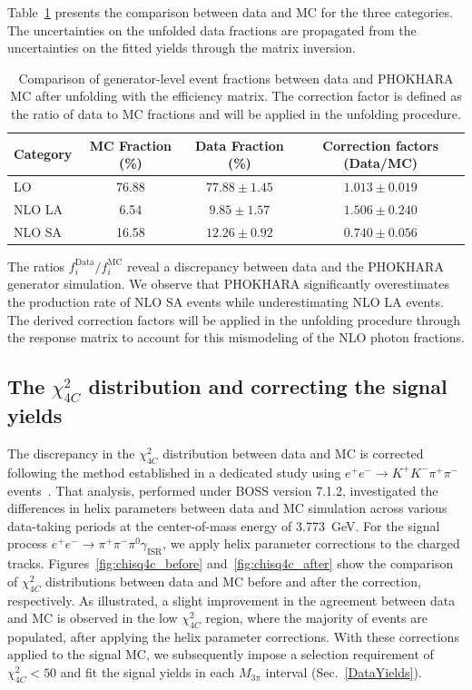 Table~\ref{tab:nlo_fraction_unfolded} presents the comparison between data and MC for the three categories. The uncertainties on the unfolded data fractions are propagated from the uncertainties on the fitted yields through the matrix inversion.

\begin{table}[htbp]
    \centering
    \caption{Comparison of generator-level event fractions between data and PHOKHARA MC after unfolding with the efficiency matrix. The correction factor is defined as the ratio of data to MC fractions and will be applied in the unfolding procedure.}
    \vspace{4mm}
    \begin{tabular}{lccc}
        \hline
        Category & MC Fraction (\%) & Data Fraction (\%) & Correction factors (Data/MC) \\
        \hline
        LO       & 76.88 & $77.88 \pm 1.45$ & $1.013 \pm 0.019$ \\
        NLO LA   & 6.54  & $9.85 \pm 1.57$  & $1.506 \pm 0.240$ \\
        NLO SA   & 16.58 & $12.26 \pm 0.92$ & $0.740 \pm 0.056$ \\
        \hline
    \end{tabular}
    \label{tab:nlo_fraction_unfolded}
\end{table}

The ratios $f_i^{\text{Data}} / f_i^{\text{MC}}$ reveal a discrepancy between data and the PHOKHARA generator simulation. We observe that PHOKHARA significantly overestimates the production rate of NLO SA events while underestimating NLO LA events. The derived correction factors will be applied in the unfolding procedure through the response matrix to account for this mismodeling of the NLO photon fractions.

\subsection{The $\chi^2_{4C}$ distribution and correcting the signal yields}
\label{sec:corr_kmfit}
The discrepancy in the $\chi^2_{4C}$ distribution between data and MC is corrected following the method established in a dedicated study using $e^+e^- \to K^+K^-\pi^+\pi^-$ events~\cite{BESIII_chisq4C_correction_2025}. That analysis, performed under BOSS version 7.1.2, investigated the differences in helix parameters between data and MC simulation across various data-taking periods at the center-of-mass energy of 3.773~GeV. For the signal process $e^+e^- \to \pi^+\pi^-\pi^0\gamma_{\text{ISR}}$, we apply helix parameter corrections to the charged tracks. Figures~\ref{fig:chisq4c_before} and~\ref{fig:chisq4c_after} show the comparison of $\chi^2_{4C}$ distributions between data and MC before and after the correction, respectively. As illustrated, a slight improvement in the agreement between data and MC is observed in the low $\chi^2_{4C}$ region, where the majority of events are populated, after applying the helix parameter corrections. With these corrections applied to the signal MC, we subsequently impose a selection requirement of $\chi^2_{4C} < 50$ and fit the signal yields in each $M_{3\pi}$ interval (Sec.~\ref{DataYields}).

